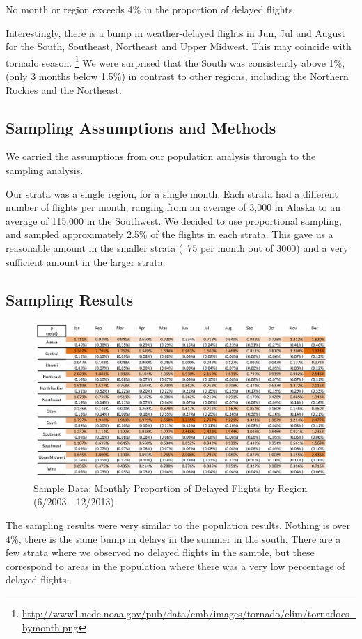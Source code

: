 \documentclass{article}
\begin{document}
\begin{multicols}{2}
No month or region exceeds 4\% in the proportion of delayed flights.

Interestingly, there is a bump in weather-delayed flights in Jun, Jul and August for the South, Southeast, Northeast and Upper Midwest. This may coincide with tornado season. \footnote{\url{http://www1.ncdc.noaa.gov/pub/data/cmb/images/tornado/clim/tornadoes_bymonth.png}} We were surprised that the South was consistently above 1\%, (only 3 months below 1.5\%) in contrast to other regions, including the Northern Rockies and the Northeast.


\subsection{Sampling Assumptions and Methods}
We carried the assumptions from our population analysis through to the sampling analysis.

Our strata was a single region, for a single month. Each strata had a different number of flights per month, ranging from an average of 3,000 in Alaska to an average of 115,000 in the Southwest. We decided to use proportional sampling, and sampled approximately 2.5\% of the flights in each strata. This gave us a reasonable amount in the smaller strata (~75 per month out of 3000) and a very sufficient amount in the larger strata. 

\subsection{Sampling Results}
\begin{figure}
\centering
\caption{Sample Data: Monthly Proportion of Delayed Flights by Region (6/2003 - 12/2013)}
\includegraphics[width=\textwidth]{../Images/SampSumm_USE.pdf}
\end{figure}
The sampling results were very similar to the population results. Nothing is over 4\%, there is the same bump in delays in the summer in the south. There are a few strata where we observed no delayed flights in the sample, but these correspond to areas in the population where there was a very low percentage of delayed flights.


\end{multicols}
\end{document}
